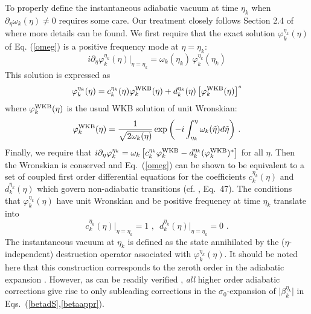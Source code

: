 \documentclass[a4paper,aps,prd,preprint,groupedaddress,nofootinbib]{revtex4}
\begin{document}
To properly define the instantaneous adiabatic vacuum \cite{BD84} 
at time $\eta_k$ when $\partial_\eta \omega_k(\eta) \neq 0$ requires
some care. Our treatment closely follows Section 2.4 of \cite{MP98}
where more details can be found.  
We first require that the exact solution $\varphi_k^{\eta_k}(\eta)$
of Eq. (\ref{omeg}) is a positive frequency mode at $\eta = \eta_k$:
\begin{equation}
\label{varphidef}
i \partial_\eta \varphi_k^{\eta_k}(\eta)\vert_{\eta = \eta_k} =  
\omega_k(\eta_k) \,
\varphi_k^{\eta_k}(\eta_k)
\end{equation}
This solution is expressed as   
\begin{equation}
\label{phiwkb}
\varphi_k^{\eta_k}(\eta) = c_k^{\eta_k}(\eta) \varphi_k^{\rm WKB}(\eta) +
d_k^{\eta_k}(\eta) \left[\varphi_k^{\rm WKB}(\eta)\right]^\ast
\end{equation}
where $\varphi_k^{\rm WKB}(\eta)$ is the usual WKB solution of unit Wronskian:
\begin{equation}
\label{WKB}
\varphi_k^{\rm WKB}(\eta) =  \frac{1}{\sqrt{2 \omega_k(\eta)}}
 \exp\left(-i  \int^\eta_{\eta_k} \omega_k(\tilde \eta) d\tilde
 \eta\right) \, .
\end{equation}
Finally, we require that $i \partial_\eta \varphi_k^{\eta_k}
= \omega_k \left[ c_k^{\eta_k}
\varphi_k^{\rm WKB} - d_k^{\eta_k}(\varphi_k^{\rm WKB})^\ast\right]$
for all $\eta$. Then the Wronskian is conserved and Eq.~(\ref{omeg}) can be shown
to be equivalent to a set of coupled first order differential equations for
the coefficients $c_k^{\eta_k}(\eta)$ and $d_k^{\eta_k}(\eta)$
which govern non-adiabatic transitions (cf. \cite{MP98}, Eq.~47). 
The conditions that $\varphi_k^{\eta_k}(\eta)$ have 
unit Wronskian and be positive frequency at time $\eta_k$ translate into 
\begin{equation}
\label{ci}
c_k^{\eta_k}(\eta)\vert_{\eta = \eta_k} = 1 \,\,,\,\,\, 
d_k^{\eta_k}(\eta)\vert_{\eta = \eta_k} = 0\,\,.
\end{equation}
The instantaneous vacuum at $\eta_k$ is defined as the 
state annihilated by the ($\eta$-independent)
destruction operator associated with $\varphi_k^{\eta_k}(\eta)$. It
should be noted here that this construction corresponds to the zeroth
order in the adiabatic expansion \cite{BD84}. However, as can be
readily verified \cite{CNP02}, {\it all} higher order adiabatic
corrections give rise to only subleading corrections in the
$\sigma_0$-expansion of $\vert \beta_k^{\eta_k} \vert$ in
Eqs.~(\ref{betadS},\ref{betaappr}).  
\end{document}
